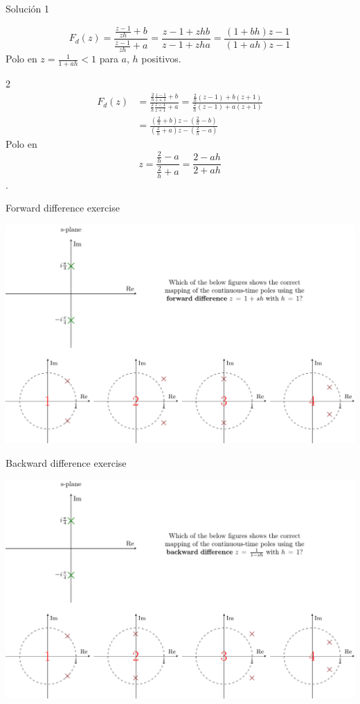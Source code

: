 \documentclass[presentation,aspectratio=1610]{beamer}
\begin{document}
\begin{frame}[label={sec:orge0c1017}]{Solución}
\alert{1}

\[F_d(z) = \frac{ \frac{z-1}{zh} + b}{\frac{z-1}{zh} + a}
             = \frac{ z-1 + zhb}{z-1+zha} = \frac{(1+bh)z - 1}{(1+ah)z - 1}\]
      Polo en \(z= \frac{1}{1+ah} < 1\) para \(a\), \(h\) positivos.

\alert{2}
\begin{align*} F_d(z) &= \frac{ \frac{2}{h}\frac{z-1}{z+1} + b}{\frac{2}{h}\frac{z-1}{z+1} + a}
            = \frac{\frac{2}{h}(z-1) + b(z+1)}{\frac{2}{h}(z-1) + a(z+1)}\\
            &= \frac{(\frac{2}{h}+b)z - (\frac{2}{h}-b)}{(\frac{2}{h}+a)z - (\frac{2}{h}-a)} \end{align*}
Polo en \[z = \frac{\frac{2}{h}-a}{\frac{2}{h}+a}  = \frac{2-ah}{2+ah}\]. 
\end{frame}
\begin{frame}[label={sec:orgaa75b0d}]{Forward difference exercise}
\begin{center}
\includegraphics[width=\linewidth]{../../figures/forward-diff-exercise}
\end{center}
\end{frame}

\begin{frame}[label={sec:org5f25c45}]{Backward difference exercise}
\begin{center}
\includegraphics[width=\linewidth]{../../figures/backward-diff-exercise}
\end{center}
\end{frame}
\end{document}
